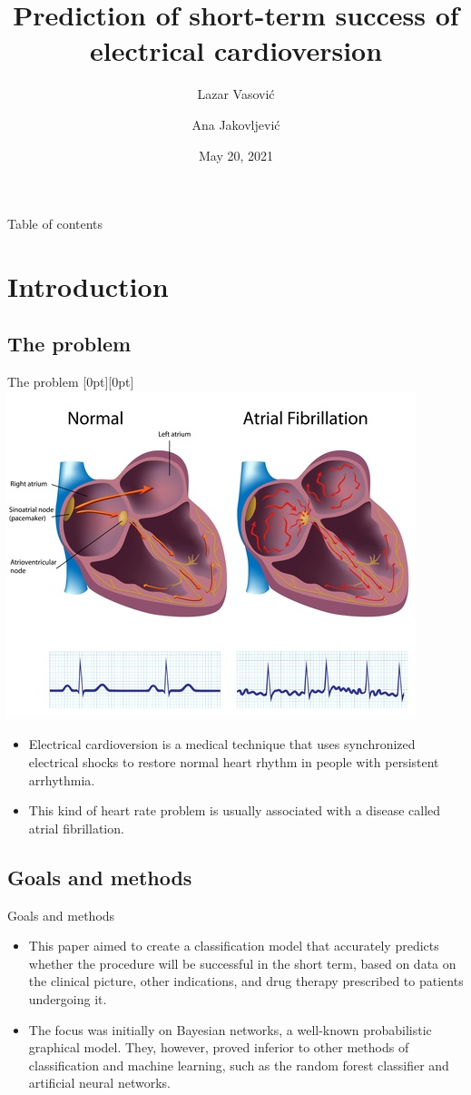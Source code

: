 \documentclass[hyperref={bookmarks=false}]{beamer}
\title[Electrical cardioversion]{Prediction of short-term success of electrical cardioversion}
\author{Lazar Vasović \and Ana Jakovljević}
\institute[]{Faculty of Mathematics, University of Belgrade\\\url{https://github.com/matfija/Elektrokonverzija}}
\date[Faculty of Mathematics]{May 20, 2021}
\newcommand{\lenitem}[2][.51\linewidth]{\parbox[t]{#1}{\strut #2\strut}}
\begin{document}
\frame{\titlepage}

\begin{frame}{Table of contents}
\tableofcontents[subsectionstyle=hide]
\end{frame}

\section{Introduction}
\subsection{The problem}
\begin{frame}{The problem}
\mbox{}\hfill\raisebox{-\height}[0pt][0pt]{\includegraphics[width=.42\linewidth]{fibrillation.jpg}}
\vspace*{-\baselineskip}

\begin{itemize}
    \item \lenitem{Electrical cardioversion is a medical technique that uses synchronized electrical shocks to restore normal heart rhythm in people with persistent arrhythmia.}

    \item \lenitem{This kind of heart rate problem is usually associated with a disease called atrial fibrillation.}
\end{itemize}
\end{frame}

\subsection{Goals and methods}
\begin{frame}{Goals and methods}
\begin{itemize}
    \item This paper aimed to create a classification model that accurately predicts whether the procedure will be successful in the short term, based on data on the clinical picture, other indications, and drug therapy prescribed to patients undergoing it.

    \item The focus was initially on Bayesian networks, a well-known probabilistic graphical model. They, however, proved inferior to other methods of classification and machine learning, such as the random forest classifier and artificial neural networks.
\end{itemize}
\end{frame}
\end{document}
